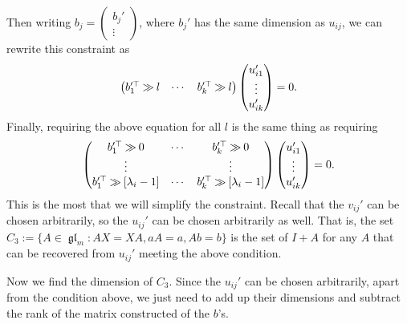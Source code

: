 \documentclass[12pt,psamsfonts]{article}
\newcommand{\rightshift}{\mathbin{\rotatebox[origin=c]{180}{$\ll$}}}
\DeclareMathOperator{\gl}{\mathfrak{gl}}
\begin{document}
Then writing \(b_j = \begin{pmatrix}
    b_j'\\
    \vdots
\end{pmatrix}\), where \(b_j'\) has the same dimension as \(u_{ij}\), we can rewrite this constraint as 
\[\begin{pmatrix}
    b_1'^\top \rightshift l & \cdots & b_k'^\top \rightshift l
\end{pmatrix} \begin{pmatrix}
    u_{i1}'\\
    \vdots\\
    u_{ik}'
\end{pmatrix} = 0.\]
Finally, requiring the above equation for all \(l\) is the same thing as requiring
\[\begin{pmatrix}
    b_1'^\top \rightshift 0 & \cdots & b_k'^\top \rightshift 0\\
    \vdots &  & \vdots \\
    b_1'^\top \rightshift [\lambda_i - 1] & \cdots & b_k'^\top \rightshift [\lambda_i - 1]
\end{pmatrix} \begin{pmatrix}
    u_{i1}'\\
    \vdots\\
    u_{ik}'
\end{pmatrix} = 0.\]
This is the most that we will simplify the constraint.
Recall that the \(v_{ij}'\) can be chosen arbitrarily, so the \(u_{ij}'\) can be chosen arbitrarily as well.
That is, the set \(C_3 := \{A \in \gl_m : AX = XA, aA = a, Ab = b\}\) is the set of \(I + A\) for any \(A\) that can be recovered from \(u_{ij}'\) meeting the above condition.
\par Now we find the dimension of \(C_3\).
Since the \(u_{ij}'\) can be chosen arbitrarily, apart from the condition above, we just need to add up their dimensions and subtract the rank of the matrix constructed of the \(b\)'s.
\end{document}
